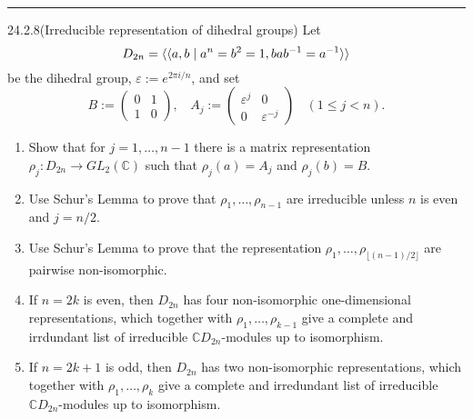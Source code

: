 \documentclass[a4paper, 12pt]{article}
\begin{document}
\noindent\rule{7in}{2.8pt}
\begin{problem}{24.2.8(Irreducible representation of dihedral groups)}
Let 
\[D_{2n}=\langle\langle a,b\mid a^n=b^2=1, bab^{-1}=a^{-1}\rangle\rangle\]
be the dihedral group, \(\varepsilon:=e^{2\pi i/n}\), and set 
\[B:=\begin{pmatrix}
	0&1\\ 
	1&0
\end{pmatrix},\ \ \ \ A_j:=\begin{pmatrix}
	\varepsilon^j&0\\ 
	0&\varepsilon^{-j}
\end{pmatrix}\ \ \ \ (1\leq j<n).\]
\begin{enumerate}[(1)]
\item Show that for \(j=1,\ldots,n-1\) there is a matrix representation \(\rho_j:D_{2n}\rightarrow GL_2(\mathbb{C})\) such that \(\rho_j(a)=A_j\) and \(\rho_j(b)=B\). 
\item Use Schur's Lemma to prove that \(\rho_1,\ldots,\rho_{n-1}\) are irreducible unless \(n\) is even and \(j=n/2\). 
\item Use Schur's Lemma to prove that the representation \(\rho_1, \ldots,\rho_{\lfloor (n-1)/2\rfloor}\) are pairwise non-isomorphic. 
\item If \(n=2k\) is even, then \(D_{2n}\) has four non-isomorphic one-dimensional representations, which together with \(\rho_1,\ldots,\rho_{k-1}\) give a complete and irrdundant list of irreducible \(\mathbb{C}D_{2n}\)-modules up to isomorphism. 
\item If \(n=2k+1\) is odd, then \(D_{2n}\) has two non-isomorphic representations, which together with \(\rho_1,\ldots,\rho_k\) give a complete and irredundant list of irreducible \(\mathbb{C}D_{2n}\)-modules up to isomorphism.
\end{enumerate}
\end{problem}
\end{document}
